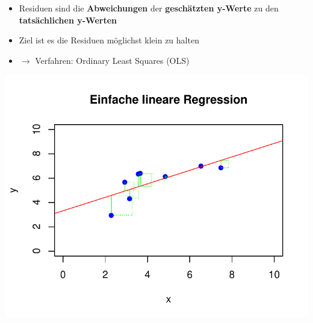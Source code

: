 \documentclass[aspectratio=169, journal, x11names, unknownkeysallowed, hyperref={colorlinks,
linkcolor = SS2,
urlcolor  = F3,
citecolor = F3,
anchorcolor = A4}, 12pt]{beamer}
\newcommand{\oarrow}{\textcolor{A1}{$\rightarrow$} }
\begin{document}
\begin{frame}[t]
  \begin{minipage}[t]{0.45\textwidth}
    \vspace{-11.5em}
    \begin{itemize}
      \item Residuen sind die \textbf{Abweichungen} der \textbf{geschätzten y-Werte} zu den \textbf{tatsächlichen y-Werten} 
      \item Ziel ist es die Residuen möglichst klein zu halten
      \item[] \oarrow Verfahren: Ordinary Least Squares (OLS)
    \end{itemize}
\end{minipage}%
\begin{minipage}[t]{0.45\textwidth}
  \centering
  \includegraphics[scale=0.5]{../Plots/reg_lin_5.pdf}
\end{minipage}
\end{frame}
\end{document}
